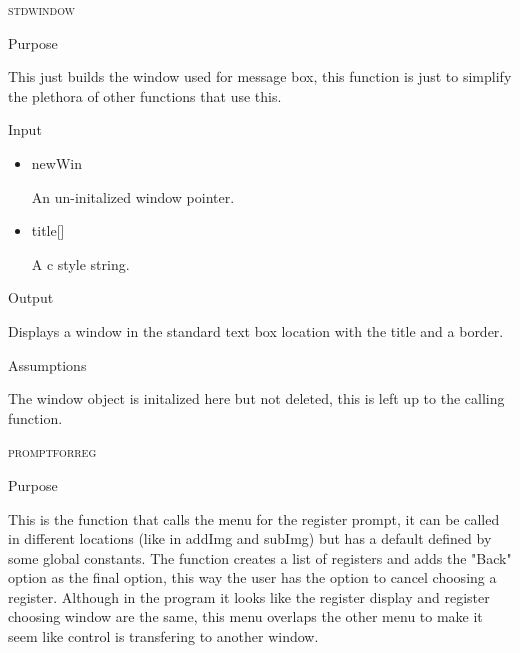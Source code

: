 \documentclass[pdftex, 11pt]{article}
\begin{document}
\begin{description}
\begin{description}
		\end{description}



	\item{\textsc{stdwindow}}
		\begin{description}
			\item{Purpose}

				This just builds the window used for message box, this function is just to
				simplify the plethora of other functions that use this.
				
			\item{Input}
				
				\begin{itemize}

					\item{newWin}

						An un-initalized window pointer.

					\item{title[]}

						A c style string.

				\end{itemize}

			\item{Output}

				Displays a window in the standard text box location with
				the title and a border.

			\item{Assumptions}

				The window object is initalized here but not deleted, this
				is left up to the calling function.

		\end{description}



	\item{\textsc{promptforreg}}
		\begin{description}
			\item{Purpose}
				
				This is the function that calls the menu for the register prompt, it can be
				called in different locations (like in addImg and subImg) but has a default
				defined by some global constants.  The function creates a list of registers
				and adds the "Back" option as the final option, this way the user has the
				option to cancel choosing a register.  Although in the program it looks like
				the register display and register choosing window are the same, this menu
				overlaps the other menu to make it seem like control is transfering to another
				window.


\end{description}
\end{description}
\end{document}
